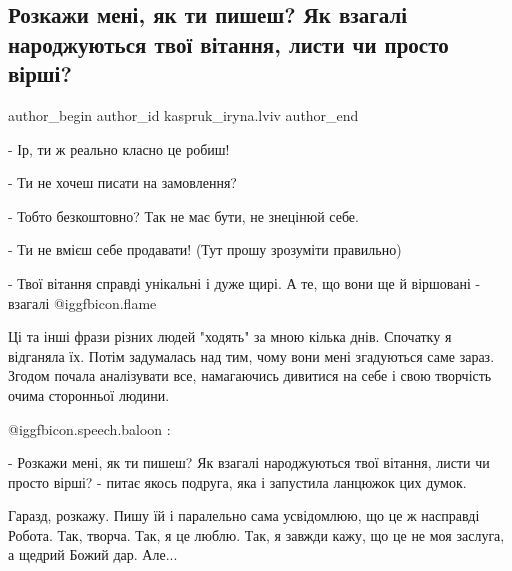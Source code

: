  
 
 
 
 
 
\subsection{Розкажи мені, як ти пишеш? Як взагалі народжуються твої вітання, листи чи просто вірші?}
\label{sec:04_11_2022.fb.kaspruk_iryna.lviv.1.jak_ty_pyshesh}
 
\ifcmt
 author_begin
   author_id kaspruk_iryna.lviv
 author_end
\fi

- Ір, ти ж реально класно це робиш!

- Ти не хочеш писати на замовлення?

- Тобто безкоштовно? Так не має бути, не знецінюй себе.

- Ти не вмієш себе продавати! (Тут прошу зрозуміти правильно)

- Твої вітання справді унікальні і дуже щирі. А те, що вони ще й віршовані -
взагалі  @igg{fbicon.flame} 


Ці та інші фрази різних людей "ходять" за мною кілька днів. Спочатку я
відганяла їх. Потім задумалась над тим, чому вони мені згадуються саме зараз.
Згодом почала аналізувати все,  намагаючись дивитися на себе і свою творчість
очима сторонньої людини. 

 @igg{fbicon.speech.baloon} : 

- Розкажи мені, як ти пишеш? Як взагалі народжуються твої вітання, листи чи
просто вірші? - питає якось подруга, яка і запустила ланцюжок цих думок. 

Гаразд, розкажу. Пишу їй і паралельно сама усвідомлюю, що це ж насправді
Робота. Так, творча. Так, я це люблю. Так, я завжди кажу, що це не моя заслуга,
а щедрий Божий дар. Але...

